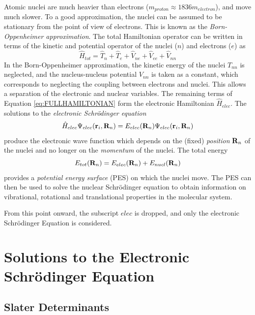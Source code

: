 Atomic nuclei are much heavier than electrons ($m_{proton} \approx 1836 m_{electron}$), and move much slower. To a good approximation, the nuclei can be assumed to be stationary from the point of view of electrons. This is known as the \emph{Born-Oppenheimer approximation}. The total Hamiltonian operator can be written in terms of the kinetic and potential operator of the nuclei ($n$) and electrons ($e$) as
\begin{equation}
\hat{H}_{tot} = \hat{T}_n + \hat{T}_e + \hat{V}_{ne} + \hat{V}_{ee} + \hat{V}_{nn}
\label{eq:FULLHAMILTONIAN}
\end{equation}
\noindent In the Born-Oppenheimer approximation, the kinetic energy of the nuclei $T_{nn}$ is neglected, and the nucleus-nucleus potential $V_{nn}$ is taken as a constant, which corresponds to neglecting the coupling between electrons and nuclei. This allows a separation of the electronic and nuclear variables. The remaining terms of Equation \ref{eq:FULLHAMILTONIAN} form the electronic Hamiltonian $\hat{H}_{elec}$. The solutions to the \emph{electronic Schrödinger equation}
\begin{equation}
\hat{H}_{elec} \Psi_{elec}(\mathbf{r}_i, \mathbf{R}_n ) = E_{elec}(\mathbf{R}_n) \Psi_{elec}(\mathbf{r}_i, \mathbf{R}_n )
\end{equation}
\noindent produce the electronic wave function which depends on the (fixed) \emph{position} $\mathbf{R}_n$ of the nuclei and no longer on the \emph{momentum} of the nuclei. The total energy
\begin{equation}
E_{tot}(\mathbf{R}_n) = E_{elec}(\mathbf{R}_n) + E_{nucl}(\mathbf{R}_n)
\end{equation} 
\noindent provides a \emph{potential energy surface} (PES) on which the nuclei move. The PES can then be used to solve the nuclear Schrödinger equation to obtain information on vibrational, rotational and translational properties in the molecular system.

From this point onward, the subscript $elec$ is dropped, and only the electronic Schrödinger Equation is considered.

\section{Solutions to the Electronic Schrödinger Equation}

\subsection{Slater Determinants}

